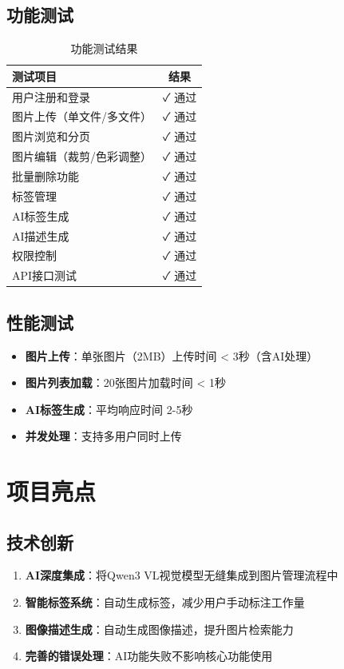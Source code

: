 \documentclass[12pt,a4paper]{article}
\begin{document}
\subsection{功能测试}

\begin{table}[h]
\centering
\caption{功能测试结果}
\begin{tabularx}{\textwidth}{|X|c|}
\hline
\textbf{测试项目} & \textbf{结果} \\
\hline
用户注册和登录 & ✓ 通过 \\
图片上传（单文件/多文件） & ✓ 通过 \\
图片浏览和分页 & ✓ 通过 \\
图片编辑（裁剪/色彩调整） & ✓ 通过 \\
批量删除功能 & ✓ 通过 \\
标签管理 & ✓ 通过 \\
AI标签生成 & ✓ 通过 \\
AI描述生成 & ✓ 通过 \\
权限控制 & ✓ 通过 \\
API接口测试 & ✓ 通过 \\
\hline
\end{tabularx}
\end{table}

\subsection{性能测试}

\begin{itemize}
    \item \textbf{图片上传}：单张图片（2MB）上传时间 < 3秒（含AI处理）
    \item \textbf{图片列表加载}：20张图片加载时间 < 1秒
    \item \textbf{AI标签生成}：平均响应时间 2-5秒
    \item \textbf{并发处理}：支持多用户同时上传
\end{itemize}

\section{项目亮点}

\subsection{技术创新}
\begin{enumerate}
    \item \textbf{AI深度集成}：将Qwen3 VL视觉模型无缝集成到图片管理流程中
    \item \textbf{智能标签系统}：自动生成标签，减少用户手动标注工作量
    \item \textbf{图像描述生成}：自动生成图像描述，提升图片检索能力
    \item \textbf{完善的错误处理}：AI功能失败不影响核心功能使用
\end{enumerate}
\end{document}
